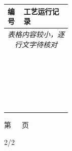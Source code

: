 \documentclass[UTF8,10pt,a4paper,fontset=fandol]{ctexart}
\newcommand{\handwritten}[1]{#1}
\begin{document}
\begin{center}
\begin{minipage}[t]{0.47\textwidth}
\vspace{0.3em}
\scriptsize
\begin{tabularx}{\linewidth}{|p{0.25\linewidth}|X|}
\hline
编号 & 工艺运行记录 \\
\hline
\multicolumn{2}{|c|}{\textit{表格内容较小，逐行文字待核对}}\\
\hline
\multicolumn{2}{|c|}{}\\
\hline
\multicolumn{2}{|c|}{}\\
\hline
\multicolumn{2}{|c|}{}\\
\hline
\multicolumn{2}{|c|}{}\\
\hline
\multicolumn{2}{|c|}{}\\
\hline
\multicolumn{2}{|c|}{}\\
\hline
\multicolumn{2}{|c|}{}\\
\hline
\multicolumn{2}{|c|}{}\\
\hline
\multicolumn{2}{|c|}{}\\
\hline
\multicolumn{2}{|c|}{}\\
\hline
\multicolumn{2}{|c|}{}\\
\hline
\multicolumn{2}{|c|}{}\\
\hline
\multicolumn{2}{|c|}{}\\
\hline
\multicolumn{2}{|c|}{}\\
\hline
\multicolumn{2}{|c|}{}\\
\hline
\multicolumn{2}{|c|}{}\\
\hline
\multicolumn{2}{|c|}{}\\
\hline
\multicolumn{2}{|c|}{}\\
\hline
\multicolumn{2}{|c|}{}\\
\hline
\multicolumn{2}{|c|}{}\\
\hline
\multicolumn{2}{|c|}{}\\
\hline
\multicolumn{2}{|c|}{}\\
\hline
\multicolumn{2}{|c|}{}\\
\hline
\end{tabularx}

\vspace{0.4em}
{\tiny 第\ \ \ 页}
\end{minipage}
\end{center}

\handwritten{2/2}

\newpage
\end{document}
